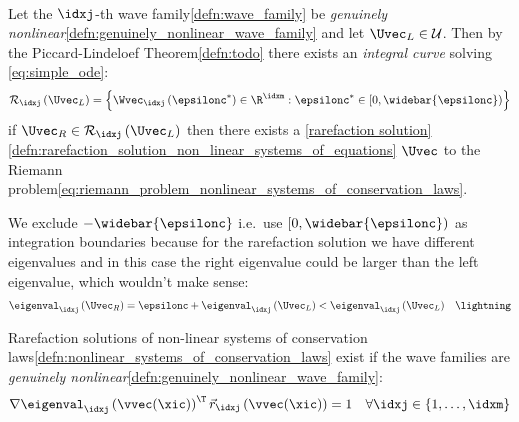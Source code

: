 \begin{lemmabox}\nospacing
    \begin{lemma}\label{lemma:existence_rarefactio_solution_non_linear_systems_of_equations}\leavevmode\\
        Let the $\idxj$-th wave family\cref{defn:wave_family} be \textit{genuinely nonlinear}\cref{defn:genuinely_nonlinear_wave_family}
        and let $\Uvec_{L}\in\admissibleset$.
        Then by the Piccard-Lindeloef Theorem\cref{defn:todo} there exists an \textit{integral curve} solving \cref{eq:simple_ode}:
        \begin{align}
          \mathcal{R}_{\idxj}\left(\Uvec_{L}\right)=\left\{\Wvec_{\idxj}\left(\epsilonc^{*}\right)\in\R^{\idxm}: \epsilonc^{*}\in[0,\widebar{\epsilonc})\right\}
        \end{align}
        if $\Uvec_{R}\in\mathcal{R}_{\idxj}\left(\Uvec_{L}\right)$ then there exists a \cref{rarefaction solution}\cref{defn:rarefaction_solution_non_linear_systems_of_equations} $\Uvec$ to the Riemann problem\cref{eq:riemann_problem_nonlinear_systems_of_conservation_laws}.
    \end{lemma}
\end{lemmabox}
\begin{notebox}\nospacing
    We exclude $-\widebar{\epsilonc}$ i.e.\ use $[0,\widebar{\epsilonc})$ as integration boundaries because for the
    rarefaction solution we have different eigenvalues and in this case the right eigenvalue could be larger than the left eigenvalue, which wouldn't make sense:
    \begin{align*}
      \eigenval_{\idxj}\left(\Uvec_{R}\right)=\epsilonc+\eigenval_{\idxj}\left(\Uvec_{L}\right)<\eigenval_{\idxj}\left(\Uvec_{L}\right)&& \lightning
    \end{align*}
\end{notebox}
\begin{propositionbox}\nospacing
    \begin{proposition}
        \label{proposition:rarefaction_and_gnl_wave_families}
        Rarefaction solutions of non-linear systems of conservation laws\cref{defn:nonlinear_systems_of_conservation_laws} exist
        if the wave families are \textit{genuinely nonlinear}\cref{defn:genuinely_nonlinear_wave_family}:
        \begin{align}
          \nabla \eigenval_{\idxj}\left(\vvec(\xic)\right)^{\T}\vec{r}_{\idxj}\left(\vvec(\xic)\right)=1&&\forall\idxj\in \left\{1,\ldots,\idxm\right\}\label{eq:rarefaction_and_gnl_wave_families}
        \end{align}
    \end{proposition}
\end{propositionbox}
